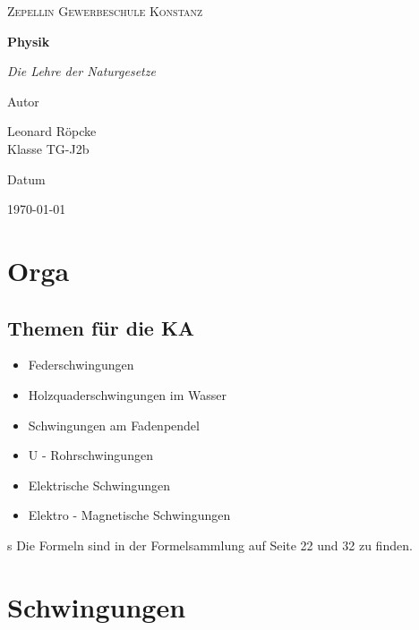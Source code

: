 \documentclass{article}
\newcommand{\AuthorName}{Leonard Röpcke\\Klasse TG-J2b}
\newcommand{\Institute}{Zepellin Gewerbeschule Konstanz}
\newcommand{\Subtitle}{Die Lehre der Naturgesetze}
\newcommand{\MyDate}{\today}
\begin{document}
\begin{titlepage}
  \centering
  {\scshape\LARGE \Institute \par}
  \vspace{2.5cm}
{\huge\bfseries Physik \par}
  \vspace{0.8cm}
  {\Large\itshape \Subtitle \par}
  \vfill
  {\Large Autor\par}
  {\Large \AuthorName \par}
  \vspace{1cm}
  {\Large Datum\par}
  {\Large \MyDate \par}
  \vfill
  \vspace{1cm}
  {\small }
\end{titlepage}
\tableofcontents
\newpage


\section{Orga}
\subsection{Themen für die KA}
\begin{itemize}
    \item Federschwingungen
    \item Holzquaderschwingungen im Wasser
    \item Schwingungen am Fadenpendel
    \item U - Rohrschwingungen
    \item Elektrische Schwingungen
    \item Elektro - Magnetische Schwingungen
\end{itemize}s
Die Formeln sind in der Formelsammlung auf Seite 22 und 32 zu finden.

\section{Schwingungen}
\end{document}
